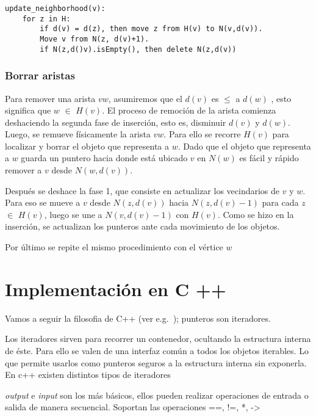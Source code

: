 \documentclass[a4paper,12pt]{article}
\begin{document}
\begin{lstlisting}
update_neighborhood(v):
    for z in H:
        if d(v) = d(z), then move z from H(v) to N(v,d(v)).
        Move v from N(z, d(v)+1).
        if N(z,d()v).isEmpty(), then delete N(z,d(v))
\end{lstlisting}



\subsubsection{Borrar  aristas}

Para remover una arista $vw$, asumiremos que el $d(v)$ es ${\leq}$ a $d(w)$ , esto significa que  $w$ ${\in}$ $H(v)$.
El proceso de remoción de la arista comienza deshaciendo la segunda fase de inserción, esto es, disminuir $d(v)$ y  $d(w)$. Luego,  se remueve físicamente la arista $vw$. Para ello se recorre $H(v)$ para localizar y borrar el objeto que representa a $w$. Dado que el objeto que representa a $w$ guarda un puntero hacia donde está ubicado $v$ en $N(w)$ es fácil y rápido remover a $v$ desde $N(w,d(v))$.



Después se deshace la fase 1, que consiste en actualizar  los vecindarios de $v$ y $w$. Para eso se mueve a $v$ desde $N(z,d(v))$ hacia $N(z,d(v)-1)$ para cada $z$ ${\in}$ $H(v)$, luego se une a  $N(v,d(v)-1)$ con $H(v)$. Como se hizo en la inserción, se actualizan los punteros ante cada movimiento de los objetos.

Por último se repite el mismo procedimiento con el vértice $w$


\section{Implementación en C ++}
\label{sec:c++}

Vamos a seguir la filosofia de C++ (ver e.g.~\cite{}); punteros son iteradores.  

Los iteradores sirven para recorrer un contenedor, ocultando la estructura interna de éste. Para ello se valen de una interfaz común a todos los objetos iterables. Lo que permite usarlos como punteros seguros a la estructura interna sin exponerla.
En c++ existen distintos tipos de iteradores 

 \emph{output} e  \emph{input }son los más básicos, ellos pueden realizar operaciones de entrada o salida de manera secuencial. Soportan las operaciones ==, !=, *, ->
\end{document}
